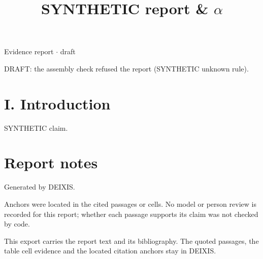 \documentclass[journal]{IEEEtran}
\begin{document}
\title{SYNTHETIC report \& \ensuremath{\alpha}}

\maketitle

\noindent Evidence report \ensuremath{\cdot} draft

\noindent DRAFT: the assembly check refused the report (SYNTHETIC unknown rule).

\section*{I. Introduction}

SYNTHETIC claim. \cite{Synth26}

\section*{Report notes}

Generated by DEIXIS.

Anchors were located in the cited passages or cells. No model or person review is recorded for this report; whether each passage supports its claim was not checked by code.

This export carries the report text and its bibliography. The quoted passages, the table cell evidence and the located citation anchors stay in DEIXIS.




\end{document}
